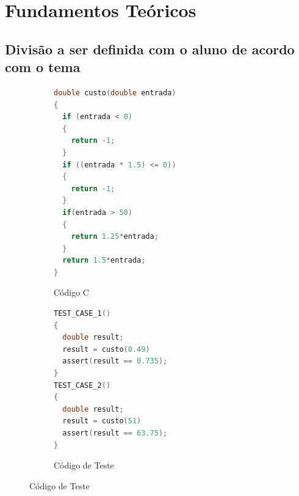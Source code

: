 \chapter{Fundamentos Teóricos}
\label{chap:conceitos}


\section{Divisão a ser definida com o aluno de acordo com o tema}


\begin{figure}[thp]
	\caption{\label{fig:program_test} Exemplo de código}
    \centering
    \begin{subfigure}{0.4\textwidth}
    \centering
    \begin{lstlisting}[language=C]       
double custo(double entrada)
{
  if (entrada < 0) 
  {
    return -1;
  }
  if ((entrada * 1.5) <= 0)) 
  {
    return -1;
  }
  if(entrada > 50) 
  {
    return 1.25*entrada;
  }
  return 1.5*entrada;
}
	\end{lstlisting}
    \caption{Código C}
  \end{subfigure}%
  \begin{subfigure}{.05\textwidth}
    \hfill
  \end{subfigure}%
  \begin{subfigure}{.4\textwidth}
    \centering
\begin{lstlisting}[language=C]   
TEST_CASE_1()
{
  double result;
  result = custo(0.49)
  assert(result == 0.735);
}
TEST_CASE_2()
{
  double result;
  result = custo(51)
  assert(result == 63.75);
}
\end{lstlisting}
    \caption{Código de Teste}
  \end{subfigure}%
\end{figure}

